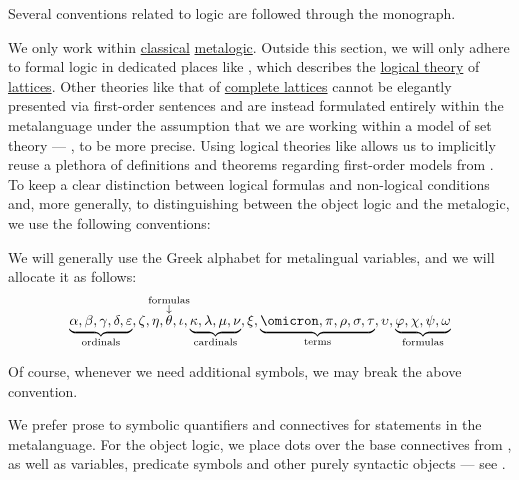 \begin{remark}\label{rem:mathematical_logic_conventions}
  Several conventions related to logic are followed through the monograph.

  We only work within \hyperref[def:classical_logic]{classical} \hyperref[con:metalogic]{metalogic}. Outside this section, we will only adhere to formal logic in dedicated places like , which describes the \hyperref[def:logical_theory]{logical theory} of \hyperref[def:lattice]{lattices}. Other theories like that of \hyperref[def:complete_lattice]{complete lattices} cannot be elegantly presented via first-order sentences and are instead formulated entirely within the metalanguage under the assumption that we are working within a model of set theory --- \hyperref[def:axiom_of_universes]{}, to be more precise. Using logical theories like  allows us to implicitly reuse a plethora of definitions and theorems regarding first-order models from . To keep a clear distinction between logical formulas and non-logical conditions and, more generally, to distinguishing between the object logic and the metalogic, we use the following conventions:

  \begin{thmenum}
     We will generally use the Greek alphabet for metalingual variables, and we will allocate it as follows:
    \begin{equation*}
      \underbrace{\alpha, \beta, \gamma, \delta, \varepsilon}_{\T{ordinals}},
      \zeta, \eta,
      \overset{ \mathclap{ \substack{ \T{formulas} \\ \downarrow } } }{\theta},
      \iota,
      \underbrace{\kappa, \lambda, \mu, \nu}_{\T{cardinals}},
      \xi,
      \underbrace{\omicron, \pi, \rho, \sigma, \tau}_{\T{terms}},
      \upsilon,
      \underbrace{\varphi, \chi, \psi, \omega}_{\T{formulas}}
    \end{equation*}

    Of course, whenever we need additional symbols, we may break the above convention.

     We prefer prose to symbolic quantifiers and connectives for statements in the metalanguage. For the object logic, we place dots over the base connectives from , as well as variables, predicate symbols and other purely syntactic objects --- see .


\end{thmenum}
\end{remark}

